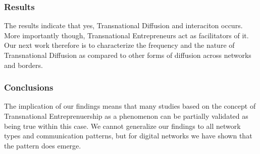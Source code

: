 \subsubsection{Results}
The results indicate that yes, Transnational Diffusion and interaciton
occurs. More importantly though, Transnational Entrepreneurs act as
facilitators of it. Our next work therefore is to characterize the
frequency and the nature of Transnational Diffusion as compared to
other forms of diffusion across networks and borders.

\subsubsection{Conclusions}
The implication of our findings means that many studies based on the
concept of Transnational Entreprenuership as a phenomenon can be
partially validated as being true within this case. We cannot
generalize our findings to all network types and communication
patterns, but for digital networks we have shown that the pattern does
emerge.






